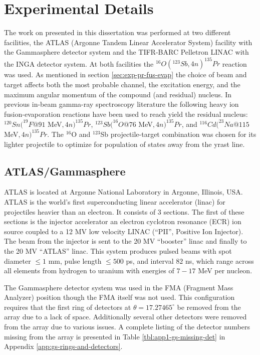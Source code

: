 \section{Experimental Details}
\label{sec:exp-pr-details}
The work on \pr{} presented in this dissertation was performed at two different facilities, the ATLAS (Argonne Tandem Linear Accelerator System) facility with the Gammasphere detector system and the TIFR-BARC Pelletron LINAC with the INGA detector system. At both facilities the $^{16}O(^{123}Sb,4n)^{135}Pr$ reaction was used. As mentioned in section \ref{sec:exp-pr-fus-evap} the choice of beam and target affects both the most probable channel, the excitation energy, and the maximum angular momentum of the compound (and residual) nucleus. In previous in-beam gamma-ray spectroscopy literature the following heavy ion fusion-evaporation reactions have been used to reach yield the \pr{} residual nucleus: $^{120}Sn(^{19}F @ 91$ MeV$, 4n)^{135}Pr$\cite{semkow135Pr}, $^{123}Sb(^{16}O @ 76$ MeV$,4n)^{135}Pr$\cite{135PrLifetimes}, and  $^{116}Cd(^{23}Na @ 115$ MeV$,4n)^{135}Pr$\cite{ePaul135Pr}. The $^{16}$O and $^{123}$Sb projectile-target combination was chosen for its lighter projectile to optimize for population of states away from the yrast line.

\subsection{ATLAS/Gammasphere}
\label{ssec:exp-pr-details-gs}
ATLAS is located at Argonne National Laboratory in Argonne, Illinois, USA. ATLAS is the world's first superconducting linear accelerator (linac) for projectiles heavier than an electron. It consists of 3 sections. The first of these sections is the injector accelerator an electron cyclotron resonance (ECR) ion source coupled to a 12 MV low velocity LINAC (``PII'', Positive Ion Injector). The beam from the injector is sent to the 20 MV ``booster'' linac and finally to the 20 MV ``ATLAS'' linac. This system produces pulsed beams with spot diameter $\leq1$ mm, pulse length $\leq500$ ps, and interval $82$ ns, which range across all elements from hydrogen to uranium with energies of $7-17$ MeV per nucleon.

The Gammasphere detector system was used in the FMA (Fragment Mass Analyzer) position though the FMA itself was not used. This configuration requires that the first ring of detectors at $\theta{}=17.27465^{\circ}$ be removed from the array due to a lack of space. Additionally several other detectors were removed from the array due to various issues. A complete listing of the detector numbers missing from the array is presented in Table \ref{tbl:app1-gs-missing-det} in Appendix \ref{app:gs-rings-and-detectors}.

